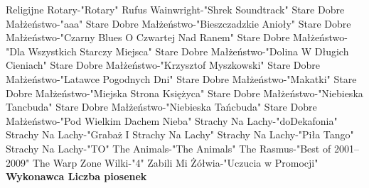 \documentclass{article}
\begin{document}
{ Religijne   \newline
 Rotary-"Rotary"   \newline
 Rufus Wainwright-"Shrek Soundtrack"   \newline
 Stare Dobre Małżeństwo-"aaa"   \newline
 Stare Dobre Małżeństwo-"Bieszczadzkie Anioły"   \newline
 Stare Dobre Małżeństwo-"Czarny Blues O Czwartej Nad Ranem"   \newline
 Stare Dobre Małżeństwo-"Dla Wszystkich Starczy Miejsca"   \newline
 Stare Dobre Małżeństwo-"Dolina W Długich Cieniach"   \newline
 Stare Dobre Małżeństwo-"Krzysztof Myszkowski"   \newline
 Stare Dobre Małżeństwo-"Latawce Pogodnych Dni"   \newline
 Stare Dobre Małżeństwo-"Makatki"   \newline
 Stare Dobre Małżeństwo-"Miejska Strona Księżyca"   \newline
 Stare Dobre Małżeństwo-"Niebieska Tancbuda"   \newline
 Stare Dobre Małżeństwo-"Niebieska Tańcbuda"   \newline
 Stare Dobre Małżeństwo-"Pod Wielkim Dachem Nieba"   \newline
 Strachy Na Lachy-"doDekafonia"   \newline
 Strachy Na Lachy-"Grabaż I Strachy Na Lachy"   \newline
 Strachy Na Lachy-"Piła Tango"   \newline
 Strachy Na Lachy-"TO"   \newline
 The Animals-"The Animals"   \newline
 The Rasmus-"Best of 2001–2009"   \newline
 The Warp Zone   \newline
 Wilki-"4"   \newline
 Zabili Mi Żółwia-"Uczucia w Promocji"   \newline
\newpage\textbf{
Wykonawca \tab Liczba piosenek} 


}
\end{document}
